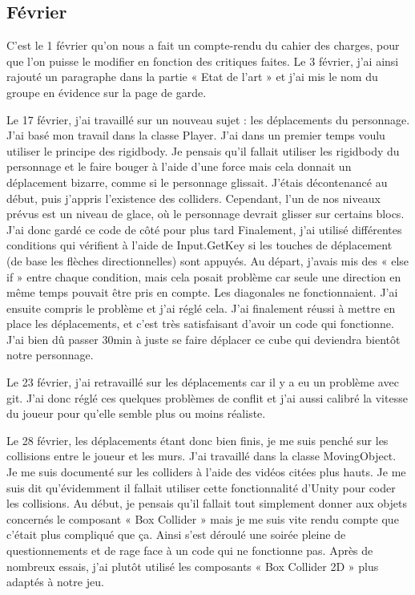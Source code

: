 \documentclass[]{extarticle}
\begin{document}
\begin{spacing}{1.25}
\subsection{Février}
\bigbreak
\bigbreak
C’est le 1 février qu’on nous a fait un compte-rendu du cahier des charges, pour que l’on puisse le modifier en fonction des critiques faites. Le 3 février, j’ai ainsi rajouté un paragraphe dans la partie « Etat de l’art » et j’ai mis le nom du groupe en évidence sur la page de garde.
\bigbreak

\bigbreak
\bigbreak

Le 17 février, j’ai travaillé sur un nouveau sujet : les déplacements du personnage. J’ai basé mon travail dans la classe Player.
\bigbreak
J’ai dans un premier temps voulu utiliser le principe des rigidbody. Je pensais qu’il fallait utiliser les rigidbody du personnage et le faire bouger à l’aide d’une force mais cela donnait un déplacement bizarre, comme si le personnage glissait. J’étais décontenancé au début, puis j’appris l’existence des colliders.
\bigbreak
Cependant, l’un de nos niveaux prévus est un niveau de glace, où le personnage devrait glisser sur certains blocs. J’ai donc gardé ce code de côté pour plus tard
\bigbreak
Finalement, j’ai utilisé différentes conditions qui vérifient à l’aide de Input.GetKey si les touches de déplacement (de base les flèches directionnelles) sont appuyés. Au départ, j’avais mis des « else if » entre chaque condition, mais cela posait problème car seule une direction en même temps pouvait être pris en compte. Les diagonales ne fonctionnaient. J’ai ensuite compris le problème et j’ai réglé cela.
\bigbreak
J’ai finalement réussi à mettre en place les déplacements, et c’est très satisfaisant d’avoir un code qui fonctionne. J’ai bien dû passer 30min à juste se faire déplacer ce cube qui deviendra bientôt notre personnage.
\bigbreak

\bigbreak
\bigbreak
Le 23 février, j’ai retravaillé sur les déplacements car il y a eu un problème avec git. J’ai donc réglé ces quelques problèmes de conflit et j’ai aussi calibré la vitesse du joueur pour qu’elle semble plus ou moins réaliste.
\bigbreak

\bigbreak
\bigbreak
Le 28 février, les déplacements étant donc bien finis, je me suis penché sur les collisions entre le joueur et les murs. J’ai travaillé dans la classe MovingObject.
\bigbreak
Je me suis documenté sur les colliders à l’aide des vidéos citées plus hauts. Je me suis dit qu’évidemment il fallait utiliser cette fonctionnalité d’Unity pour coder les collisions. Au début, je pensais qu’il fallait tout simplement donner aux objets concernés le composant « Box Collider » mais je me suis vite rendu compte que c’était plus compliqué que ça.
\bigbreak
Ainsi s’est déroulé une soirée pleine de questionnements et de rage face à un code qui ne fonctionne pas. Après de nombreux essais, j’ai plutôt utilisé les composants « Box Collider 2D » plus adaptés à notre jeu. 
\bigbreak
\bigbreak


\end{spacing}
\end{document}
